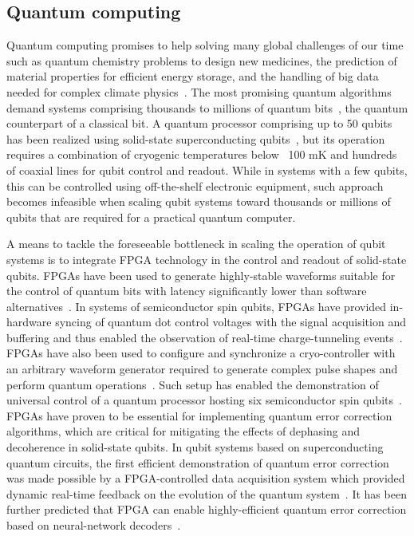 \subsection{Quantum computing}
\label{sec:quant}
Quantum computing promises to help solving many global challenges of our time such as quantum chemistry problems to design new medicines, the prediction of material properties for efficient energy storage, and the handling of big data needed for complex climate physics~\cite{Gibney-nat-2014}. The most promising quantum algorithms demand systems comprising thousands to millions of quantum bits~\cite{Meter-2013}, the quantum counterpart of a classical bit. A quantum processor comprising up to 50 qubits has been realized using solid-state superconducting qubits~\cite{Arute-nat-2019}, but its operation requires a combination of cryogenic temperatures below ~100 mK and hundreds of coaxial lines for qubit control and readout. %
While in systems with a few qubits, this can be controlled using off-the-shelf electronic equipment, such approach becomes infeasible when scaling qubit systems toward thousands or millions of qubits that are required for a practical quantum computer. 


A means to tackle the foreseeable bottleneck in scaling the operation of qubit systems is to integrate FPGA technology in the control and readout of solid-state qubits. FPGAs have been used to generate highly-stable waveforms suitable for the control of quantum bits with latency significantly lower than software alternatives~\cite{Ireland-2020}. In systems of semiconductor spin qubits, FPGAs have provided in-hardware syncing of quantum dot control voltages with the signal acquisition and buffering and thus enabled the observation of real-time charge-tunneling events~\cite{Hartman-2023}. FPGAs have also been used to configure and synchronize a cryo-controller with an arbitrary waveform generator required to generate complex pulse shapes and perform quantum operations~\cite{Xue-nat-2021}. Such setup has enabled the demonstration of universal control of a quantum processor hosting six semiconductor spin qubits~\cite{Philips-nat-2022}. FPGAs have proven to be essential for implementing quantum error correction algorithms, which are critical for mitigating the effects of dephasing and decoherence in solid-state qubits. %
In qubit systems based on superconducting quantum circuits, the first efficient demonstration of quantum error correction was made possible by a FPGA-controlled data acquisition system which provided dynamic real-time feedback on the evolution of the quantum system~\cite{Ofek-nat-2016}. It has been further predicted that FPGA can enable highly-efficient quantum error correction based on neural-network decoders~\cite{Overwater-2022}.

